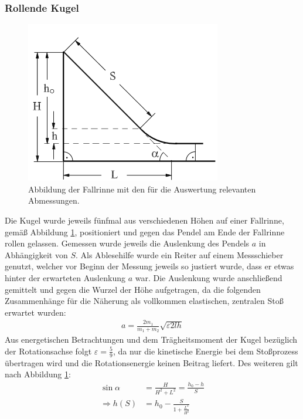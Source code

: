 \subsubsection*{Rollende Kugel}

\begin{figure}[h]
	\centering
	\includegraphics[width=0.7\linewidth]{res/FallrinneSkizze}
	\caption{Abbildung der Fallrinne mit den für die Auswertung relevanten Abmessungen\cite{anleitung-ws2017}.}
	\label{fig:rinneskizze}
\end{figure}


Die Kugel wurde jeweils fünfmal aus verschiedenen Höhen auf einer Fallrinne, gemäß Abbildung \ref{fig:rinneskizze}, positioniert und gegen das Pendel am Ende der Fallrinne rollen gelassen. Gemessen wurde jeweils die Auslenkung des Pendels $a$ in Abhängigkeit von $S$. Als Ablesehilfe wurde ein Reiter auf einem Messschieber genutzt, welcher vor Beginn der Messung jeweils so justiert wurde, dass er etwas hinter der erwarteten Auslenkung $a$ war.
Die Auslenkung wurde anschließend gemittelt und gegen die Wurzel der Höhe aufgetragen, da die folgenden Zusammenhänge für die Näherung als vollkommen elastischen, zentralen Stoß erwartet wurden:
\begin{align}
a=\frac{2m_1}{m_1+m_2}\sqrt{\varepsilon 2 l h} \label{eq:alenkrinne}
\end{align}
Aus energetischen Betrachtungen und dem Trägheitsmoment der Kugel bezüglich der Rotationsachse folgt $\varepsilon=\frac{5}{9}$, da nur die kinetische Energie  bei dem Stoßprozess übertragen wird und die Rotationsenergie keinen Beitrag liefert.
Des weiteren gilt nach Abbildung \ref{fig:rinneskizze}:
\begin{align}
\sin \alpha &=\frac{H}{H^2+L^2}=\frac{h_0-h}{S} \\
\Rightarrow  h(S) &= h_0-\frac{S}{1+\frac{L^2}{H^2}}
\end{align}
















